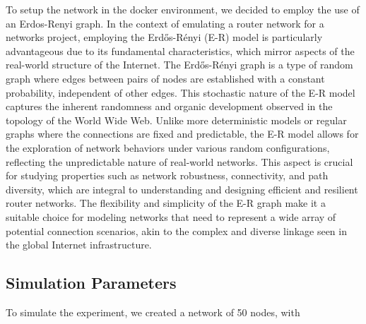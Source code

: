 To setup the network in the docker environment, we decided to employ the use of an
Erdos-Renyi graph.
In the context of emulating a router network for a networks project, employing the Erdős-Rényi (E-R) model is particularly advantageous due to its fundamental characteristics, which mirror aspects of the real-world structure of the Internet\cite{Li2021}. The Erdős-Rényi graph is a type of random graph where edges between pairs of nodes are established with a constant probability, independent of other edges. This stochastic nature of the E-R model captures the inherent randomness and organic development observed in the topology of the World Wide Web. Unlike more deterministic models or regular graphs where the connections are fixed and predictable, the E-R model allows for the exploration of network behaviors under various random configurations, reflecting the unpredictable nature of real-world networks. This aspect is crucial for studying properties such as network robustness, connectivity, and path diversity, which are integral to understanding and designing efficient and resilient router networks. The flexibility and simplicity of the E-R graph make it a suitable choice for modeling networks that need to represent a wide array of potential connection scenarios, akin to the complex and diverse linkage seen in the global Internet infrastructure.

\subsection{Simulation Parameters}

To simulate the experiment, we created a network of 50 nodes, with 





